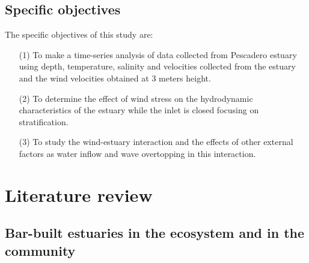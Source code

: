 \documentclass[11pt,letterpaper]{article}
\begin{document}
\subsection{Specific objectives}

The specific objectives of this study are:
\begin{enumerate}
    \item [(1)] To make a time-series analysis of data collected from Pescadero estuary using depth, temperature, salinity and velocities collected from the estuary and the wind velocities obtained at 3 meters height.
    \item [(2)] To determine the effect of wind stress on the hydrodynamic characteristics of the estuary while the inlet is closed focusing on stratification.
    \item [(3)] To study the wind-estuary interaction and the effects of other external factors as water inflow and wave overtopping in this interaction.
\end{enumerate}

\section{Literature review}


\subsection{Bar-built estuaries in the ecosystem and in the community}
\end{document}
